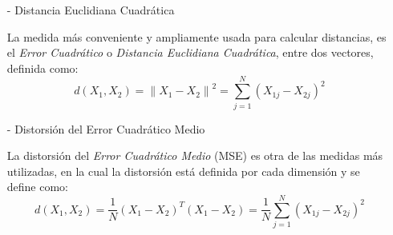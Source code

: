 \begin{enumerate}
\begin{enumerate}
\item[-]Distancia Euclidiana Cuadrática
\par
La medida más conveniente y ampliamente usada para calcular distancias, es el \textit{Error Cuadrático} o \textit{Distancia Euclidiana Cuadrática}, entre dos vectores, definida como:
\begin{equation}
\label{eq:ecuacion99}
d(X_{1},X_{2}) = \left \| X_{1} - X_{2} \right \|^{2} = \sum_{j=1}^{N}(X_{1j} - X_{2j})^2
\end{equation}

\item[-]Distorsión del Error Cuadrático Medio
\par
La distorsión del \textit{Error Cuadrático Medio} (MSE) es otra de las medidas más utilizadas, en la cual la distorsión está definida por cada dimensión y se define como:
\begin{equation}
\label{eq:ecuacion100}
d(X_{1},X_{2}) = \frac{1}{N}(X_{1} - X_{2})^{T}(X_{1} - X_{2}) = \frac{1}{N}\sum_{j=1}^{N}(X_{1j} - X_{2j})^2
\end{equation}
\end{enumerate}


\end{enumerate}
